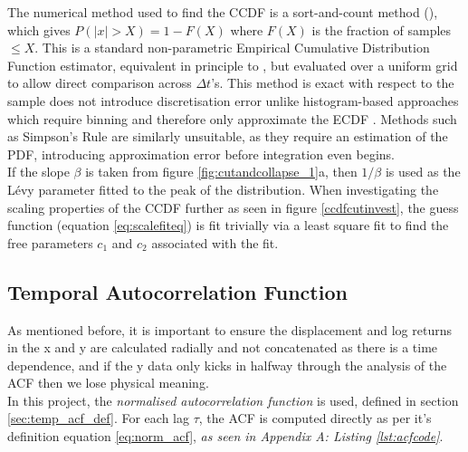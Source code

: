 The numerical method used to find the CCDF is a sort-and-count method (), which gives $P(|x|> X) = 1 - F(X)$ where $F(X)$ is the fraction of samples $\leq X$. This is a standard non-parametric Empirical Cumulative Distribution Function estimator, equivalent in principle to , but evaluated 
over a uniform grid to allow direct comparison across $\Delta t$'s. This method is exact with respect to the sample does not introduce discretisation error unlike histogram-based approaches which require binning and therefore only approximate the ECDF \cite{MatplotlibECDF}. Methods such as Simpson's Rule are similarly unsuitable, as they require an estimation of the PDF, introducing approximation error before integration even begins.\\

If the slope $\beta$ is taken from figure \ref{fig:cutandcollapse_1}a, then $1/\beta$ is used as the Lévy parameter fitted to the peak of the distribution. When investigating the scaling properties of the CCDF further as seen in figure \ref{ccdfcutinvest}, the guess function (equation \ref{eq:scalefiteq}) is fit trivially via a least square fit to find the free parameters $c_1$ and $c_2$ associated with the fit.\\

\subsection{Temporal Autocorrelation Function}
As mentioned before, it is important to ensure the displacement and log returns in the x and y are calculated radially and not concatenated as there is a time dependence, and if the y data only kicks in halfway through the analysis of the ACF then we lose physical meaning.\\

In this project, the \textit{normalised autocorrelation function} is used, defined in section \ref{sec:temp_acf_def}. For each lag $\tau$, the ACF is computed directly as per it's definition equation \ref{eq:norm_acf}, \textit{as seen in Appendix A: Listing \ref{lst:acfcode}}.
